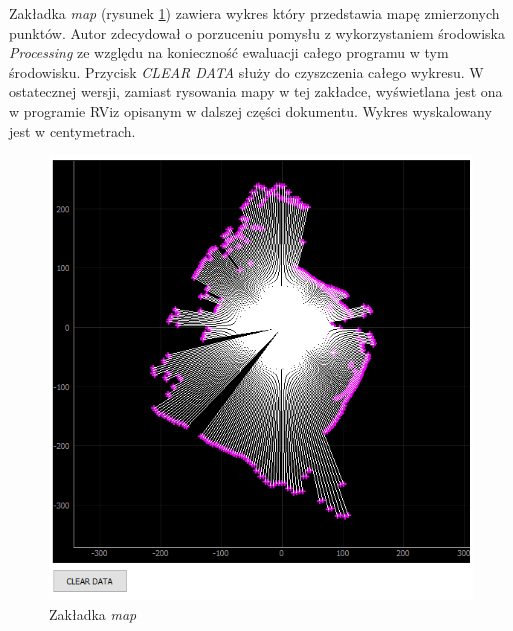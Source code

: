 Zakładka \emph{map} (rysunek \ref{fig:main-app-map-section}) zawiera wykres który przedstawia mapę zmierzonych punktów. Autor zdecydował o porzuceniu pomysłu z wykorzystaniem środowiska \emph{Processing} ze względu na konieczność ewaluacji całego programu w tym środowisku. Przycisk \emph{CLEAR DATA} służy do czyszczenia całego wykresu. W ostatecznej wersji, zamiast rysowania mapy w tej zakładce, wyświetlana jest ona w programie RViz opisanym w dalszej części dokumentu. Wykres wyskalowany jest w centymetrach.
\begin{figure}[ht]
	\centering
		\includegraphics[width=0.8\linewidth]{rys/main-app-view-map.PNG}
	\caption{Zakładka \emph{map}}
	\label{fig:main-app-map-section}
\end{figure}

